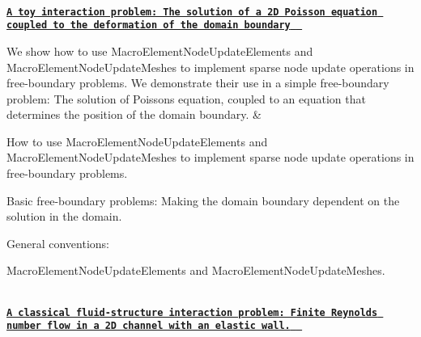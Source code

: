 \begin{longtabu}
\\
\href{../../interaction/macro_element_free_boundary_poisson/html/index.html}{\tt {\bfseries  A toy interaction problem\+: The solution of a 2D Poisson equation coupled to the deformation of the domain boundary } }

We show how to use {\ttfamily Macro\+Element\+Node\+Update\+Elements} and {\ttfamily Macro\+Element\+Node\+Update\+Meshes} to implement sparse node update operations in free-\/boundary problems. We demonstrate their use in a simple free-\/boundary problem\+: The solution of Poisson\textquotesingle{}s equation, coupled to an equation that determines the position of the domain boundary.  &
\begin{DoxyItemize}
\item How to use {\ttfamily Macro\+Element\+Node\+Update\+Elements} and {\ttfamily Macro\+Element\+Node\+Update\+Meshes} to implement sparse node update operations in free-\/boundary problems.
\item Basic free-\/boundary problems\+: Making the domain boundary dependent on the solution in the domain.
\item General conventions\+:
\begin{DoxyItemize}
\item {\ttfamily Macro\+Element\+Node\+Update\+Elements} and {\ttfamily Macro\+Element\+Node\+Update\+Meshes}. 
\end{DoxyItemize}
\end{DoxyItemize}



\\
\href{../../interaction/fsi_collapsible_channel/html/index.html}{\tt {\bfseries A classical fluid-\/structure interaction problem\+: Finite Reynolds number flow in a 2D channel with an elastic wall. } }


\end{longtabu}
